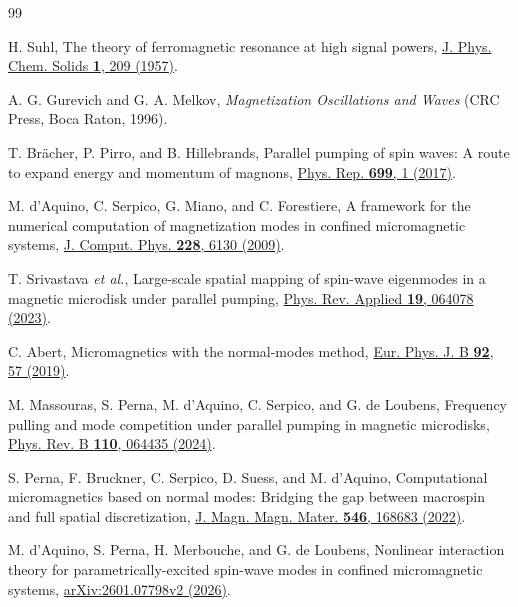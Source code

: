 \documentclass[aps,prb,reprint,superscriptaddress,floatfix]{revtex4-2}
\begin{document}
\begin{thebibliography}{99}

H. Suhl, 
The theory of ferromagnetic resonance at high signal powers,
\href{https://doi.org/10.1016/0022-3697(57)90010-0}{J. Phys. Chem. Solids \textbf{1}, 209 (1957)}.

A. G. Gurevich and G. A. Melkov, 
\textit{Magnetization Oscillations and Waves} 
(CRC Press, Boca Raton, 1996).

T. Br\"acher, P. Pirro, and B. Hillebrands, 
Parallel pumping of spin waves: A route to expand energy and momentum of magnons,
\href{https://doi.org/10.1016/j.physrep.2017.07.003}{Phys. Rep. \textbf{699}, 1 (2017)}.

M. d'Aquino, C. Serpico, G. Miano, and C. Forestiere, 
A framework for the numerical computation of magnetization modes in confined micromagnetic systems,
\href{https://doi.org/10.1016/j.jcp.2009.05.026}{J. Comput. Phys. \textbf{228}, 6130 (2009)}.

T. Srivastava \textit{et al.}, 
Large-scale spatial mapping of spin-wave eigenmodes in a magnetic microdisk under parallel pumping,
\href{https://doi.org/10.1103/PhysRevApplied.19.064078}{Phys. Rev. Applied \textbf{19}, 064078 (2023)}.

C. Abert, 
Micromagnetics with the normal-modes method,
\href{https://doi.org/10.1140/epjb/e2019-90587-9}{Eur. Phys. J. B \textbf{92}, 57 (2019)}.

M. Massouras, S. Perna, M. d'Aquino, C. Serpico, and G. de Loubens, 
Frequency pulling and mode competition under parallel pumping in magnetic microdisks,
\href{https://doi.org/10.1103/PhysRevB.110.064435}{Phys. Rev. B \textbf{110}, 064435 (2024)}.

S. Perna, F. Bruckner, C. Serpico, D. Suess, and M. d'Aquino, 
Computational micromagnetics based on normal modes: Bridging the gap between macrospin and full spatial discretization,
\href{https://doi.org/10.1016/j.jmmm.2021.168683}{J. Magn. Magn. Mater. \textbf{546}, 168683 (2022)}.

M. d'Aquino, S. Perna, H. Merbouche, and G. de Loubens, 
Nonlinear interaction theory for parametrically-excited spin-wave modes in confined micromagnetic systems,
\href{https://arxiv.org/abs/2601.07798}{arXiv:2601.07798v2 (2026)}.


\end{thebibliography}
\end{document}
